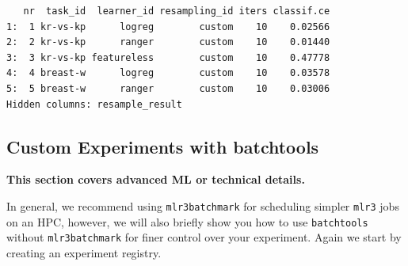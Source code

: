 \begin{verbatim}
   nr  task_id  learner_id resampling_id iters classif.ce
1:  1 kr-vs-kp      logreg        custom    10    0.02566
2:  2 kr-vs-kp      ranger        custom    10    0.01440
3:  3 kr-vs-kp featureless        custom    10    0.47778
4:  4 breast-w      logreg        custom    10    0.03578
5:  5 breast-w      ranger        custom    10    0.03006
Hidden columns: resample_result
\end{verbatim}

\hypertarget{sec-custom-experiments}{%
\subsection{Custom Experiments with
batchtools}\label{sec-custom-experiments}}

\begin{tcolorbox}[enhanced jigsaw, colframe=quarto-callout-note-color-frame, rightrule=.15mm, bottomrule=.15mm, toprule=.15mm, opacityback=0, colback=white, left=2mm, arc=.35mm, breakable, leftrule=.75mm]
\begin{minipage}[t]{5.5mm}
\textcolor{quarto-callout-note-color}{\faInfo}
\end{minipage}%
\begin{minipage}[t]{\textwidth - 5.5mm}

\textbf{This section covers advanced ML or technical
details.}\vspace{2mm}

\end{minipage}%
\end{tcolorbox}

In general, we recommend using \texttt{mlr3batchmark} for scheduling
simpler \texttt{mlr3} jobs on an HPC, however, we will also briefly show
you how to use \texttt{batchtools} without \texttt{mlr3batchmark} for
finer control over your experiment. Again we start by creating an
experiment registry.

\begin{Shaded}
\begin{Highlighting}[]
\OtherTok{=} \NormalTok{(}
   \NormalTok{,}
   \NormalTok{,}
   
\NormalTok{)}
\end{Highlighting}
\end{Shaded}

